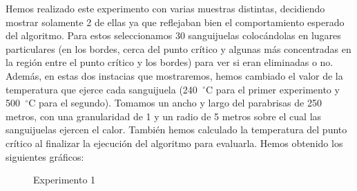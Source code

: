 \documentclass[10pt, a4paper]{article}
\begin{document}
Hemos realizado este experimento con varias muestras distintas, decidiendo mostrar solamente 2 de ellas ya que reflejaban bien el comportamiento esperado del algoritmo. Para estos seleccionamos 30 sanguijuelas coloc\'andolas en lugares particulares (en los bordes, cerca del punto cr\'itico y algunas m\'as concentradas en la regi\'on entre el punto cr\'itico y los bordes) para ver si eran eliminadas o no. Adem\'as, en estas dos instacias que mostraremos, hemos cambiado el valor de la temperatura que ejerce cada sanguijuela (240\hspace{-1.5mm}$\phantom{a}^{\circ}$C para el primer experimento y 500\hspace{-1.5mm}$\phantom{a}^{\circ}$C para el segundo). Tomamos un ancho y largo del parabrisas de 250 metros, con una granularidad de 1 y un radio de 5 metros sobre el cual las sanguijuelas ejercen el calor. Tambi\'en hemos calculado la temperatura del punto cr\'itico al finalizar la ejecuci\'on del algoritmo para evaluarla. Hemos obtenido los siguientes gr\'aficos:

\begin{figure}[H]
\centering
	\caption{Experimento 1} 
\end{figure}
\end{document}

